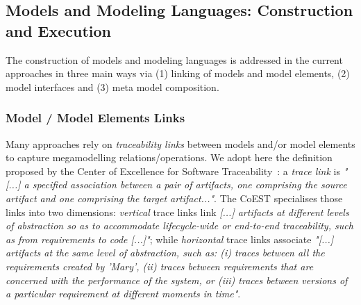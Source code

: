 \subsection{Models and Modeling Languages: Construction and Execution}%
\label{subsec:maml_cae}%
%
The construction of models and modeling languages is addressed in the current approaches in three
main ways  via (1) linking of models and model elements, (2) model interfaces
and (3) meta model composition.

\subsubsection{Model / Model Elements Links}
 
Many approaches rely on \emph{traceability links} between models and/or model elements to capture 
megamodelling relations/operations. We adopt here the definition proposed by the Center
of Excellence for Software Traceability~\cite{CoEST-website}: a \emph{trace link} is 
\emph{"[...] a specified association between a pair of artifacts, one comprising 
the source artifact and one comprising the target artifact..."}. The CoEST specialises those links into
two dimensions: \emph{vertical} trace links link \emph{[...] artifacts at different levels of
abstraction so as to accommodate lifecycle-wide or end-to-end traceability, such
as from requirements to code [...]"}; while \emph{horizontal} trace links associate 
\emph{"[...] artifacts at the same level of abstraction, such as: (i) traces
between all the requirements created by 'Mary', (ii) traces between
requirements that are concerned with the performance of the system, or (iii)
traces between versions of a particular requirement at different moments in
time"}.

